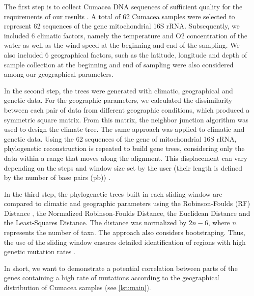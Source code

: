     The first step is to collect Cumacea DNA sequences of sufficient quality for the requirements of our results \citep{koshkarov_phylogeography_2022}. A total of 62 Cumacea samples were selected to represent 62 sequences of the gene mitochondrial 16S rRNA. Subsequently, we included 6 climatic factors, namely the temperature and O2 concentration of the water as well as the wind speed at the beginning and end of the sampling. We also included 6 geographical factors, such as the latitude, longitude and depth of sample collection at the beginning and end of sampling were also considered among our geographical parameters.

    In the second step, the trees were generated with climatic, geographical and genetic data. For the geographic parameters, we calculated the dissimilarity between each pair of data from different geographic conditions, which produced a symmetric square matrix. From this matrix, the neighbor junction algorithm was used to design the climate tree. The same approach was applied to climatic and genetic data. Using the 62 sequences of the gene of mitochondrial 16S rRNA, phylogenetic reconstruction is repeated to build gene trees, considering only the data within a range that moves along the alignment. This displacement can vary depending on the steps and window size set by the user (their length is defined by the number of base pairs (pb)) \citep{koshkarov_phylogeography_2022}.

    In the third step, the phylogenetic trees built in each sliding window are compared to climatic and geographic parameters using the Robinson-Foulds (RF) Distance \citep{robinson_comparison_1981, koshkarov_phylogeography_2022}, the Normalized Robinson-Foulds Distance, the Euclidean Distance and the Least-Squares Distance. The distance was normalized by $2n-6$, where $n$ represents the number of taxa. The approach also considers bootstraping. Thus, the use of the sliding window ensures detailed identification of regions with high genetic mutation rates \citep{koshkarov_phylogeography_2022}.

In short, we want to demonstrate a potential correlation between parts of the genes containing a high rate of mutations according to the geographical distribution of Cumacea samples (see \autoref{lst:main}).

